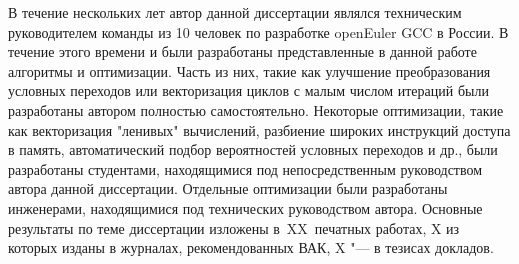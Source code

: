 {\contribution} В течение нескольких лет автор данной диссертации являлся техническим руководителем команды из 10 человек по разработке openEuler GCC в России. В течение этого времени и были разработаны представленные в данной работе алгоритмы и оптимизации. Часть из них, такие как  улучшение преобразования условных переходов или векторизация циклов с малым числом итераций  были разработаны автором полностью самостоятельно. Некоторые оптимизации, такие как векторизация "ленивых"\phantom{ } вычислений, разбиение широких инструкций доступа в память, автоматический подбор вероятностей условных переходов и др., были разработаны студентами, находящимися под непосредственным руководством автора данной диссертации. Отдельные оптимизации были разработаны инженерами, находящимися под технических руководством автора.
{%
    {\publications} Основные результаты по теме диссертации изложены
    в~XX~печатных работах,
    X из которых изданы в журналах, рекомендованных ВАК,
    X "--- в тезисах докладов.
}%

